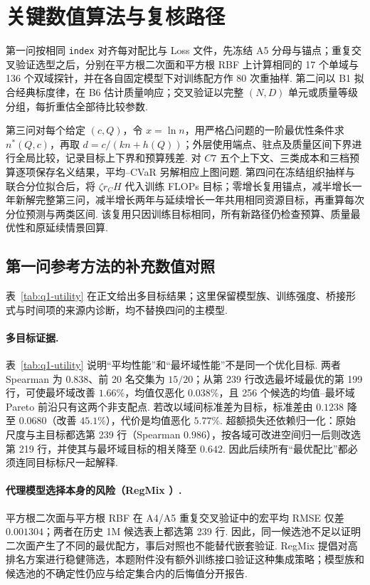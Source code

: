 \section{关键数值算法与复核路径}\label{app:v39-algorithms}
第一问按相同 \texttt{index} 对齐每对配比与 Loss 文件，先冻结 A5 分母与锚点；重复交叉验证选型之后，分别在平方根二次面和平方根 RBF 上计算相同的 17 个单域与 136 个双域探针，并在各自固定模型下对训练配方作 80 次重抽样. 第二问以 B1 拟合经典标度律，在 B6 估计质量响应；交叉验证以完整 $(N,D)$ 单元或质量等级分组，每折重估全部待比较参数. 

第三问对每个给定 $(c,Q)$，令 $x=\ln n$，用严格凸问题的一阶最优性条件求 $n^*(Q,c)$，再取 $d=c/(kn+h(Q))$；外层使用端点、驻点及质量区间下界进行全局比较，记录目标上下界和预算残差. 对 $C7$ 五个上下文、三类成本和三档预算逐项保存名义结果，平均--CVaR 另解相应上图问题. 第四问在冻结组织抽样与联合分位拟合后，将 $\zeta r_CH$ 代入训练 FLOPs 目标；零增长复用锚点，减半增长一年新解完整第三问，减半增长两年与延续增长一年共用相同资源目标，再重算每次分位预测与两类区间. 该复用只因训练目标相同，所有新路径仍检查预算、质量最优性和原延续情景回算. 


\subsection{第一问参考方法的补充数值对照}\label{app:q1-method-crosschecks}
表~\ref{tab:q1-utility} 在正文给出多目标结果；这里保留模型族、训练强度、桥接形式与时间项的来源内诊断，均不替换四问的主模型. 
\paragraph{多目标证据. \quad} 表~\ref{tab:q1-utility} 说明“平均性能”和“最坏域性能”不是同一个优化目标. 两者 Spearman 为 $0.838$、前 20 名交集为 $15/20$；从第 239 行改选最坏域最优的第 199 行，可使最坏域改善 $1.66\%$，均值仅恶化 $0.038\%$，且 256 个候选的均值--最坏域 Pareto 前沿只有这两个非支配点. 若改以域间标准差为目标，标准差由 $0.1238$ 降至 $0.0680$（改善 $45.1\%$），代价是均值恶化 $5.77\%$. 超额损失还依赖归一化：原始尺度与主目标都选第 239 行（Spearman $0.986$），按各域可改进空间归一后则改选第 219 行，并使其与最坏域目标的相关降至 $0.642$. 因此后续所有“最优配比”都必须连同目标标尺一起解释. 

\paragraph{代理模型选择本身的风险（RegMix \cite{regmix}）. \quad}
平方根二次面与平方根 RBF 在 A4/A5 重复交叉验证中的宏平均 RMSE 仅差 $0.001304$；两者在历史 1M 候选表上都选第 239 行. 因此，同一候选池不足以证明二次面产生了不同的最优配方，事后对照也不能替代嵌套验证. RegMix 提倡对高排名方案进行稳健筛选，本题附件没有额外训练接口验证这种集成策略；模型族和候选池的不确定性仍应与给定集合内的后悔值分开报告. 


